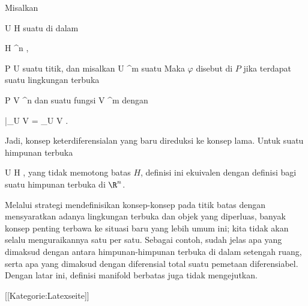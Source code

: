 {}
{

Misalkan

\mavergleichskette
{\vergleichskette
{ U
}
{ \subseteq }{ H
}
{  }{
}
{    }{
}
{   }{
}
}
{}{}{}
suatu
di dalam

\mavergleichskette
{\vergleichskette
{ H
}
{ \subseteq }{ \R^n
}
{  }{
}
{    }{
}
{   }{
}
}
{}{}{,}

\mavergleichskette
{\vergleichskette
{ P
}
{ \in }{ U
}
{  }{
}
{    }{
}
{   }{
}
}
{}{}{}
suatu titik, dan misalkan
\maabbdisp {\varphi} { U } {\R^m
} {}
suatu
Maka $\varphi$ disebut  di $P$ jika terdapat suatu lingkungan terbuka

\mavergleichskette
{\vergleichskette
{ P
}
{ \in }{ V
}
{ \subseteq }{ \R^n
}
{    }{
}
{   }{
}
}
{}{}{}
dan suatu fungsi
\maabbdisp {\tilde{\varphi}} { V } {\R^m
} {}
dengan

\mavergleichskette
{\vergleichskette
{ \tilde{\varphi} {{|}}_{U \cap V}
}
{ = }{\varphi {{|}}_{U \cap V}
}
{  }{
}
{    }{
}
{   }{
}
}
{}{}{.}

}
Jadi, konsep keterdiferensialan yang baru direduksi ke konsep lama. Untuk suatu himpunan terbuka

\mavergleichskette
{\vergleichskette
{ U
}
{ \subseteq }{ H
}
{  }{
}
{    }{
}
{   }{
}
}
{}{}{,}
yang tidak memotong batas $H$, definisi ini ekuivalen dengan definisi bagi suatu himpunan terbuka di $\R^n$.

Melalui strategi mendefinisikan konsep-konsep pada titik batas dengan mensyaratkan adanya lingkungan terbuka dan objek yang diperluas, banyak konsep penting terbawa ke situasi baru yang lebih umum ini; kita tidak akan selalu menguraikannya satu per satu. Sebagai contoh, sudah jelas apa yang dimaksud dengan  {} antara himpunan-himpunan terbuka di dalam setengah ruang, serta apa yang dimaksud dengan diferensial total suatu pemetaan diferensiabel. Dengan latar ini, definisi manifold berbatas juga tidak mengejutkan.

 [[Kategorie:Latexseite]]
